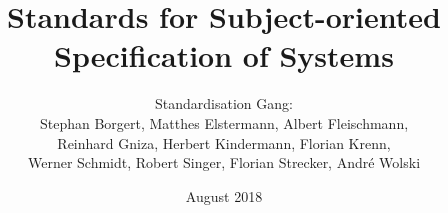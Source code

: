 \documentclass[a4paper,12pt]{book}
\begin{document}
	
	\author{Standardisation Gang: \\ Stephan Borgert, Matthes Elstermann, Albert Fleischmann, \\ Reinhard Gniza, Herbert Kindermann, Florian Krenn,\\ Werner Schmidt, Robert Singer, Florian Strecker, André Wolski}
	\title{Standards for Subject-oriented\\ Specification of Systems}
	\date{August 2018}
	
	\frontmatter
	\maketitle
	\tableofcontents
	
	\mainmatter
	
	
	
	
	
	
\end{document}
